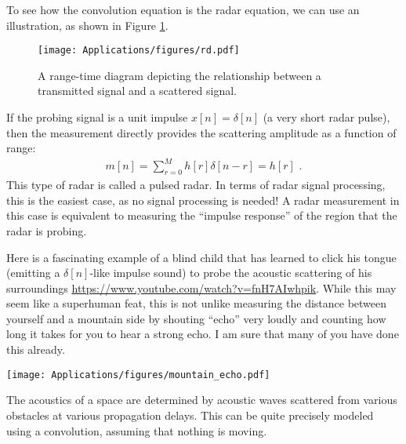 To see how the convolution equation is the radar equation, we can use
an illustration, as shown in Figure \ref{fig:range_time_diagram}.
\begin{figure}
\begin{center}
\texttt{[image: Applications/figures/rd.pdf]}
\end{center}
\caption{A range-time diagram depicting the relationship between a transmitted signal and a scattered signal.}
\label{fig:range_time_diagram}
\end{figure}

If the probing signal is a unit impulse $x[n]=\delta[n]$ (a very short
radar pulse), then the measurement directly provides the scattering
amplitude as a function of range:
\begin{align}
m[n] = \sum_{r=0}^M h[r]\delta[n-r] = h[r]\,\,.
\end{align}
This type of radar is called a pulsed radar. In terms of radar
signal processing, this is the easiest case, as no signal processing
is needed! A radar measurement in this case is equivalent to measuring
the ``impulse response'' of the region that the radar is probing.

Here is a fascinating example of a blind child that has learned to
click his tongue (emitting a $\delta[n]$-like impulse sound) to probe the
acoustic scattering of his
surroundings \url{https://www.youtube.com/watch?v=fnH7AIwhpik}. While
this may seem like a superhuman feat, this is not unlike measuring the
distance between yourself and a mountain side by shouting ``echo''
very loudly and counting how long it takes for you to hear a strong
echo. I am sure that many of you have done this already.

\begin{marginfigure}
\begin{center}
\texttt{[image: Applications/figures/mountain\_echo.pdf]}
\end{center}
\caption{The acoustics of a space are determined by acoustic waves
scattered from various obstacles at various propagation delays. This
can be quite precisely modeled using a convolution, assuming that
nothing is moving.}
\end{marginfigure}


